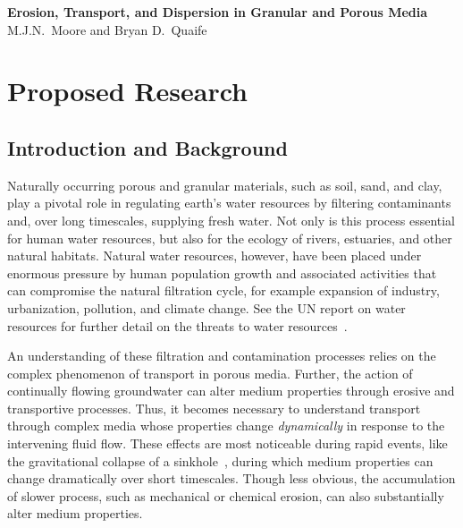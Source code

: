 \documentclass[11pt]{article}
\begin{document}
\begin{center}
{\large \bf Erosion, Transport, and Dispersion in Granular
and Porous Media} 
\\
M.J.N.~Moore and Bryan D.~Quaife
\end{center}


\section{Proposed Research} 

\subsection{Introduction and Background} 

Naturally occurring porous and granular materials, such as soil, sand, and clay, play a pivotal role in regulating earth's water resources by filtering contaminants and, over long timescales, supplying fresh water.  Not only is this process essential for human water resources, but also for the ecology of rivers, estuaries, and other natural habitats.  Natural water resources, however, have been placed under enormous pressure by human population growth and associated activities that can compromise the natural filtration cycle, for example expansion of industry, urbanization, pollution, and climate change. See the UN report on water resources for further detail on the threats to water resources~\cite{UNwater}.

An understanding of these filtration and contamination processes relies on the complex phenomenon of transport in porous media. Further, the action of continually flowing groundwater can alter medium properties through erosive and transportive processes. Thus, it becomes necessary to understand transport through complex media whose properties change {\em dynamically} in response to the intervening fluid flow. These effects are most noticeable during rapid events, like the gravitational collapse of a sinkhole~\cite{sandhu2018fate}, during which medium properties can change dramatically over short timescales. Though less obvious, the accumulation of slower process, such as mechanical or chemical erosion, can also substantially alter medium properties.  
\end{document}
